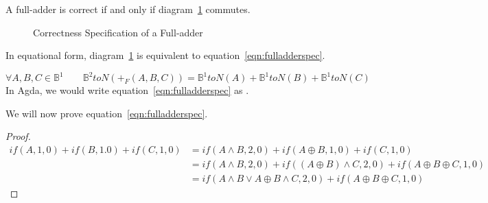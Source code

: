 \documentclass[14pt]{extarticle}  %
\begin{document}
A full-adder is correct if and only if diagram~\ref{fig:fulladder} commutes.
\begin{figure}[h]
\centering
\caption{Correctness Specification of a Full-adder}
\label{fig:fulladder}
\end{figure}

In equational form, diagram~\ref{fig:fulladder} is equivalent to equation~\ref{eqn:fulladderspec}.

\begin{equation}\label{eqn:fulladderspec}
  \forall A,B, C \in \mathbb{B}^{1} \qquad \mathbb{B}^{2}toN(+_{F}(A,B,C)) = \mathbb{B}^{1}toN(A) + \mathbb{B}^{1}toN(B)+\mathbb{B}^{1}toN(C)
\end{equation}
 In Agda, we would write equation~\ref{eqn:fulladderspec} as .

We will now prove equation~\ref{eqn:fulladderspec}.

\begin{proof}
  \begin{align}
    if(A,1,0) + if(B,1.0) + if(C,1,0)
    &= if(A \land B , 2, 0) + if(A \oplus B, 1, 0) + if(C, 1, 0) \\
    &= if(A \land B , 2, 0) + if( (A \oplus B) \land C, 2, 0) + if(A \oplus B \oplus C, 1, 0) \\
    &= if( A \land B \lor A \oplus B \land C , 2 , 0 ) + if(A \oplus B \oplus C , 1, 0)
    \end{align}
\end{proof}
\end{document}
